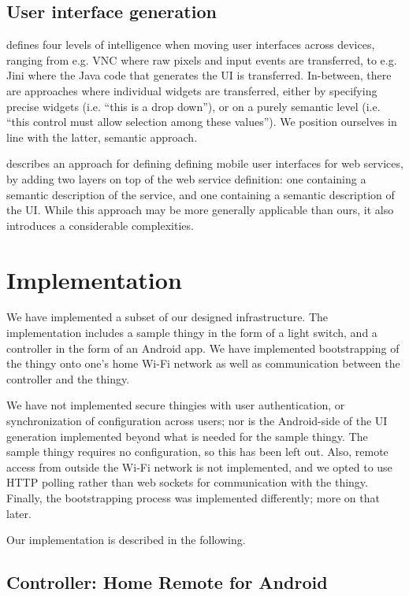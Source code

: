 \documentclass{ubicomp2012}
\begin{document}
\subsection{User interface generation}

\cite{kindbergSystem} defines four levels of intelligence when moving user interfaces across devices, ranging from e.g. VNC\cite{vnc} where raw pixels and input events are transferred, to e.g. Jini\cite{jini} where the Java code that generates the UI is transferred. In-between, there are approaches where individual widgets are transferred, either by specifying precise widgets (i.e. ``this is a drop down''), or on a purely semantic level (i.e. ``this control must allow selection among these values''). We position ourselves in line with the latter, semantic approach.

\cite{mobileServiceUsage} describes an approach for defining defining mobile user interfaces for web services, by adding two layers on top of the web service definition: one containing a semantic description of the service, and one containing a semantic description of the UI. While this approach may be more generally applicable than ours, it also introduces a considerable complexities.
\section{Implementation}

We have implemented a subset of our designed infrastructure. The implementation includes a sample thingy in the form of a light switch, and a controller in the form of an Android app. We have implemented bootstrapping of the thingy onto one's home Wi-Fi network as well as communication between the controller and the thingy.

We have not implemented secure thingies with user authentication, or synchronization of configuration across users; nor is the Android-side of the UI generation implemented beyond what is needed for the sample thingy. The sample thingy requires no configuration, so this has been left out. Also, remote access from outside the Wi-Fi network is not implemented, and we opted to use HTTP polling rather than web sockets for communication with the thingy. Finally, the bootstrapping process was implemented differently; more on that later.

Our implementation is described in the following.

\subsection{Controller: Home Remote for Android}
\end{document}
